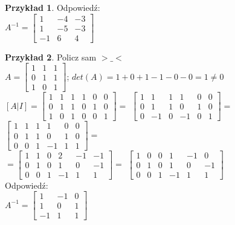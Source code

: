 \documentclass{article}
\theoremstyle{definition}
\theoremstyle{definition}
\theoremstyle{definition}
\newtheorem{pk}{Przykład}[subsection]
\theoremstyle{definition}
\begin{document}
\begin{pk}
    Odpowiedź:\\

    $ A^{-1}= \left[\begin{array}{ccc}
        1 & -4 & -3 \\
        1 & -5 & -3 \\
        -1 & 6 & 4 
        \end{array}\right]  $
    
\end{pk}

\begin{pk}
    Policz sam $>\_<$\\
    $A= \left[\begin{array}{ccc}
        1 & 1 & 1 \\
        0 & 1 & 1 \\
        1 & 0 & 1 
        \end{array}\right]  $;
    $det(A) = 1 + 0 + 1 - 1 - 0 - 0 = 1 \neq 0$\\
    $[A|I]= \left[\begin{array}{ccc|ccc}
        1 & 1 & 1 & 1 & 0 & 0 \\
        0 & 1 & 1 & 0 & 1 & 0 \\
        1 & 0 & 1 & 0 & 0 & 1 
        \end{array}\right] =$
    $ \left[\begin{array}{ccc|ccc}
        1 & 1 & 1 & 1 & 0 & 0 \\
        0 & 1 & 1 & 0 & 1 & 0 \\
        0 & -1 & 0 & -1 & 0 & 1 
        \end{array}\right]  =$
    $ \left[\begin{array}{ccc|ccc}
        1 & 1 & 1 & 1 & 0 & 0 \\
        0 & 1 & 1 & 0 & 1 & 0 \\
        0 & 0 & 1 & -1 & 1 & 1 
        \end{array}\right]  =$\\
    $ =\left[\begin{array}{ccc|ccc}
        1 & 1 & 0 & 2 & -1 & -1 \\
        0 & 1 & 0 & 1 & 0 & -1 \\
        0 & 0 & 1 & -1 & 1 & 1 
        \end{array}\right]=$
    $ \left[\begin{array}{ccc|ccc}
        1 & 0 & 0 & 1 & -1 & 0 \\
        0 & 1 & 0 & 1 & 0 & -1 \\
        0 & 0 & 1 & -1 & 1 & 1 
        \end{array}\right]  $\\

    Odpowiedź:\\

    $ A^{-1}= \left[\begin{array}{ccc}
        1 & -1 & 0 \\
        1 & 0 & 1 \\
        -1 & 1 & 1 
        \end{array}\right]  $
    
\end{pk}
\end{document}
